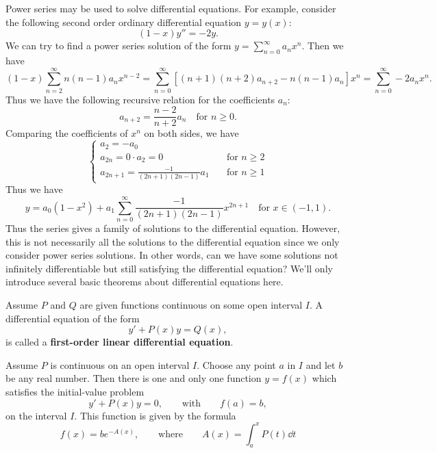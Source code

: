     \begin{exampleenv}
        Power series may be used to solve differential equations. For example, consider the following second order ordinary differential equation $y=y(x)$:
        $$ (1-x) y'' = -2y.$$
        We can try to find a power series solution of the form $\displaystyle y = \sum_{n=0}^\infty a_n x^n$. Then we have
        \[
        (1-x) \sum_{n=2}^\infty n(n-1) a_n x^{n-2} = \sum_{n=0}^{\infty}\left[ (n+1)(n+2) a_{n+2} - n(n-1) a_n \right] x^n = \sum_{n=0}^\infty -2 a_n x^n.
        \]
        Thus we have the following recursive relation for the coefficients $a_n$:
        $$ a_{n+2} = \frac{n-2}{n+2} a_n \quad \text{for } n\ge 0. $$
        Comparing the coefficients of $x^n$ on both sides, we have 
        $$ \begin{cases}
            a_2 = -a_0 \\
            a_{2n} =  0 \cdot a_2 = 0 \quad &\text{for } n\ge 2 \\
            a_{2n+1} = \displaystyle \frac{-1}{(2n+1)(2n-1)} a_1 \quad &\text{for } n\ge 1
        \end{cases}
        $$
        Thus we have
        $$ y = a_0 (1-x^2) + a_1 \sum_{n=0}^\infty \frac{-1}{(2n+1)(2n-1)} x^{2n+1} \quad \text{for } x\in (-1,1). $$
        Thus the series gives a family of solutions to the differential equation. However, this is not necessarily all the solutions to the differential equation since we only consider power series solutions. In other words, can we have some solutions not infinitely differentiable but still satisfying the differential equation? We'll only introduce several basic theorems about differential equations here.
    \end{exampleenv}
    \begin{definitionenv}
        Assume $P$ and $Q$ are given functions continuous on some open interval \(I\). A differential equation of the form
        \[
        y'+P(x)y=Q(x),
        \]
        is called a \textbf{first-order linear differential equation}.
    \end{definitionenv}
    \begin{theoremenv}
        Assume \(P\) is continuous on an open interval \(I\). Choose any point \(a\) in \(I\) and
        let \(b\) be any real number. Then there is one and only one function \(y=f(x)\) which satisfies the
        initial-value problem
        \[
        y'+P(x)y=0,\qquad \text{with}\qquad f(a)=b,
        \]
        on the interval \(I\). This function is given by the formula
        \[
        f(x)=be^{-A(x)},\qquad \text{where}\qquad A(x)=\int_a^x P(t)\dd t
        \]
    \end{theoremenv}

